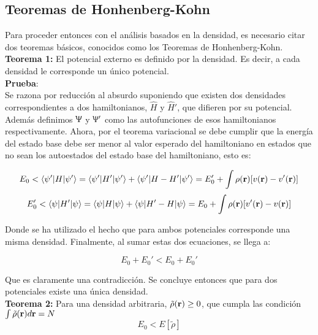 \documentclass [11pt]{article}
\begin{document}
\subsection{Teoremas de Honhenberg-Kohn}
Para proceder entonces con el análisis basados en la densidad, es necesario citar dos teoremas básicos, conocidos como los Teoremas de Honhenberg-Kohn.\\

{\bf Teorema 1:} El potencial externo es definido por la densidad. Es decir, a cada densidad le corresponde un único potencial.\\

{\bf Prueba}:\\
Se razona por reducción al absurdo suponiendo que existen dos densidades correspondientes a dos hamiltonianos, $\hat H$ y $\hat H'$, que difieren por su potencial. Además definimos $\Uppsi$ y $\Uppsi'$ como las autofunciones de esos hamiltonianos respectivamente. Ahora, por el teorema variacional se debe cumplir que la energía del estado base debe ser menor al valor esperado del hamiltoniano en estados que no sean los autoestados del estado base del hamiltoniano, esto es:

\begin{equation}
	E_0 < \langle\psi'|H|\psi'\rangle=\langle\psi'|H'|\psi'\rangle+\langle\psi'|H-H'|\psi'\rangle=E_0'+\int\rho({\bf r})[v({\bf r})-v'({\bf r})]
\end{equation}
\begin{equation}
	E_0' < \langle\psi|H'|\psi\rangle=\langle\psi|H|\psi\rangle+\langle\psi|H'-H|\psi\rangle=E_0+\int\rho({\bf r})[v'({\bf r} )-v({\bf r})]
\end{equation}

Donde se ha utilizado el hecho que para ambos potenciales corresponde una misma densidad. Finalmente, al sumar estas dos ecuaciones, se llega a:

\begin{equation}
	E_0+E_0' <E_0+E_0'
\end{equation}

Que es claramente una contradicción. Se concluye entonces que para dos potenciales existe una única densidad.\\

{\bf Teorema 2:} Para una densidad arbitraria, $\tilde \rho({\bf r}) \geq 0$, que cumpla las condición $\int \tilde\rho({\bf r})d{\bf r}=N$\\

\begin{equation}
    E_0<E[\tilde\rho]
\end{equation}	
\end{document}
